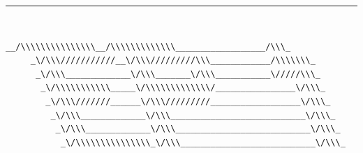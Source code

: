 \documentclass [a4paper,10pt]{article}
\begin{document}
\noindent\rule{\textwidth}{2pt}\\[-3mm]
    \linespread {0.7} {
    \begin{Verbatim}[fontsize=\small]
    __/\\\\\\\\\\\\\\\__/\\\\\\\\\\\\\__________________/\\\_        
     _\/\\\///////////__\/\\\/////////\\\____________/\\\\\\\_       
      _\/\\\_____________\/\\\_______\/\\\___________\/////\\\_      
       _\/\\\\\\\\\\\_____\/\\\\\\\\\\\\\/________________\/\\\_     
        _\/\\\///////______\/\\\/////////__________________\/\\\_    
         _\/\\\_____________\/\\\___________________________\/\\\_   
          _\/\\\_____________\/\\\___________________________\/\\\_  
           _\/\\\\\\\\\\\\\\\_\/\\\___________________________\/\\\_ 

\end{Verbatim}}
\end{document}
